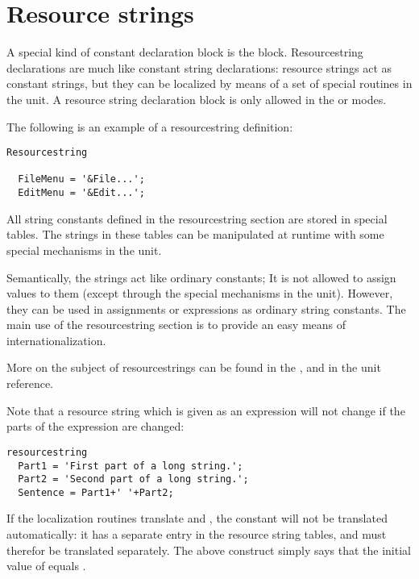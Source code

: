\section{Resource strings}
\label{se:resourcestring}
A special kind of constant declaration block is the 
block. Resourcestring declarations are much like constant string
declarations: resource strings act as constant strings, but they 
can be localized by means of a set of special routines in the 
 unit. A resource string declaration block
is only allowed in the  or  modes.

The following is an example of a resourcestring definition:
\begin{verbatim}
Resourcestring

  FileMenu = '&File...';
  EditMenu = '&Edit...';
\end{verbatim}
All string constants defined in the resourcestring section are stored
in special tables. The strings in these tables can be manipulated
at runtime with some special mechanisms in the  unit.

Semantically, the strings act like ordinary constants; It is not allowed
to assign values to them (except through the special mechanisms in the 
 unit). However, they can be used in assignments or expressions as 
ordinary string constants. The main use of the resourcestring section is 
to provide an easy means of internationalization.

More on the subject of resourcestrings can be found in the \progref, and
in the  unit reference.

\begin{remark}
Note that a resource string which is given as an expression will not change if
the parts of the expression are changed:
\begin{verbatim}
resourcestring
  Part1 = 'First part of a long string.';
  Part2 = 'Second part of a long string.';
  Sentence = Part1+' '+Part2;
\end{verbatim}
If the localization routines translate  and , the
 constant will not be translated automatically: it has a
separate entry in the resource string tables, and must therefor be
translated separately. The above construct simply says that the 
initial value of  equals .
\end{remark}

